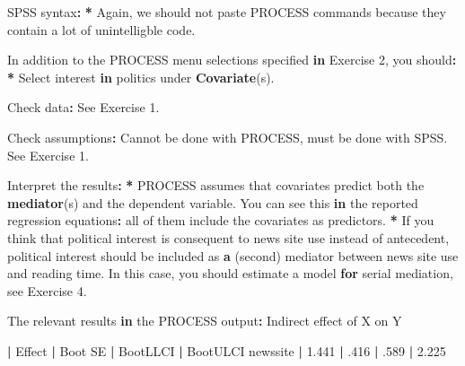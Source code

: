 \documentclass[a4paper]{book}
\newenvironment{Shaded}{\begin{snugshade}}{\end{snugshade}}
\newcommand{\KeywordTok}[1]{\textcolor[rgb]{0,0,0}{\textbf{#1}}}
\newcommand{\DecValTok}[1]{\textcolor[rgb]{0.00,0.00,0.00}{#1}}
\newcommand{\FloatTok}[1]{\textcolor[rgb]{0.00,0.00,0.00}{#1}}
\newcommand{\StringTok}[1]{\textcolor[rgb]{0.00,0.00,0.00}{#1}}
\newcommand{\ControlFlowTok}[1]{\textcolor[rgb]{0.00,0.00,0.00}{\textbf{#1}}}
\newcommand{\OperatorTok}[1]{\textcolor[rgb]{0.00,0.00,0.00}{\textbf{#1}}}
\newcommand{\ErrorTok}[1]{\textcolor[rgb]{0.00,0.00,0.00}{\textbf{#1}}}
\newcommand{\NormalTok}[1]{#1}
\theoremstyle{definition}
\theoremstyle{definition}
\theoremstyle{definition}
\theoremstyle{remark}
\begin{document}
\begin{Shaded}
\begin{Highlighting}[]
\NormalTok{SPSS syntax}\OperatorTok{:}\StringTok{  }
\StringTok{  }
\ErrorTok{*}\StringTok{ }\NormalTok{Again, we should not paste PROCESS commands because they contain a lot of}
\NormalTok{unintelligble code.}
  
\NormalTok{In addition to the PROCESS menu selections specified }\ControlFlowTok{in}\NormalTok{ Exercise }\DecValTok{2}\NormalTok{, you should}\OperatorTok{:}\StringTok{  }
\StringTok{  }
\ErrorTok{*}\StringTok{ }\NormalTok{Select interest }\ControlFlowTok{in}\NormalTok{ politics under }\KeywordTok{Covariate}\NormalTok{(s).}
  
\NormalTok{Check data}\OperatorTok{:}\StringTok{ }\NormalTok{See Exercise }\DecValTok{1}\NormalTok{.  }
  
\NormalTok{Check assumptions}\OperatorTok{:}\StringTok{ }\NormalTok{Cannot be done with PROCESS, must be done with SPSS. See}
\NormalTok{Exercise }\DecValTok{1}\NormalTok{.}
  
\NormalTok{Interpret the results}\OperatorTok{:}\StringTok{  }
\StringTok{  }
\ErrorTok{*}\StringTok{ }\NormalTok{PROCESS assumes that covariates predict both the }\KeywordTok{mediator}\NormalTok{(s) and the}
\NormalTok{dependent variable. You can see this }\ControlFlowTok{in}\NormalTok{ the reported regression equations}\OperatorTok{:}\StringTok{ }\NormalTok{all}
\NormalTok{of them include the covariates as predictors.}
\OperatorTok{*}\StringTok{ }\NormalTok{If you think that political interest is consequent to news site use instead}
\NormalTok{of antecedent, political interest should be included as }\KeywordTok{a}\NormalTok{ (second) mediator}
\NormalTok{between news site use and reading time. In this case, you should estimate a}
\NormalTok{model }\ControlFlowTok{for}\NormalTok{ serial mediation, see Exercise }\DecValTok{4}\NormalTok{.}
  
\NormalTok{The relevant results }\ControlFlowTok{in}\NormalTok{ the PROCESS output}\OperatorTok{:}\StringTok{  }
\StringTok{  }
\NormalTok{Indirect effect of X on Y   }
 
          \OperatorTok{|}\StringTok{  }\NormalTok{Effect  }\OperatorTok{|}\StringTok{  }\NormalTok{Boot SE  }\OperatorTok{|}\StringTok{  }\NormalTok{BootLLCI  }\OperatorTok{|}\StringTok{  }\NormalTok{BootULCI  }
\NormalTok{newssite  }\OperatorTok{|}\StringTok{  }\FloatTok{1.441}   \OperatorTok{|}\StringTok{  }\NormalTok{.}\DecValTok{416}     \OperatorTok{|}\StringTok{  }\NormalTok{.}\DecValTok{589}      \OperatorTok{|}\StringTok{  }\FloatTok{2.225}  


\end{Highlighting}
\end{Shaded}
\end{document}
